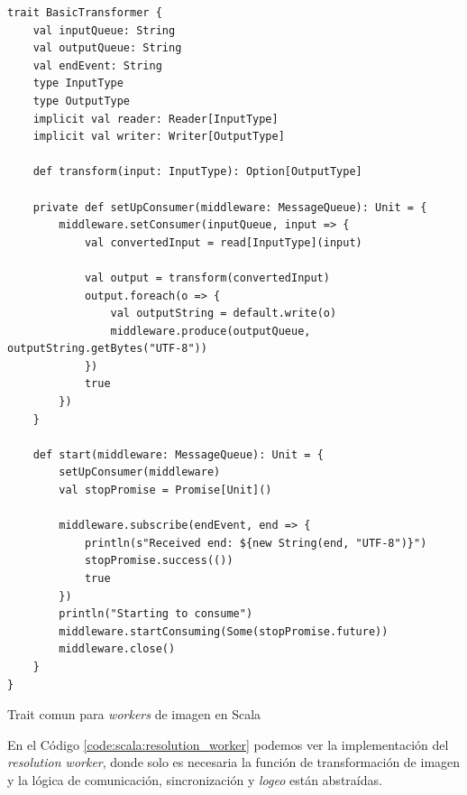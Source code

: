 \documentclass[11pt]{article}
\begin{document}
\begin{listing}[ht]
\begin{verbatim}
trait BasicTransformer {
    val inputQueue: String
    val outputQueue: String
    val endEvent: String
    type InputType
    type OutputType
    implicit val reader: Reader[InputType]
    implicit val writer: Writer[OutputType]

    def transform(input: InputType): Option[OutputType]

    private def setUpConsumer(middleware: MessageQueue): Unit = {
        middleware.setConsumer(inputQueue, input => {
            val convertedInput = read[InputType](input)

            val output = transform(convertedInput)
            output.foreach(o => {
                val outputString = default.write(o)
                middleware.produce(outputQueue, outputString.getBytes("UTF-8"))
            })
            true
        })
    }

    def start(middleware: MessageQueue): Unit = {
        setUpConsumer(middleware)
        val stopPromise = Promise[Unit]()

        middleware.subscribe(endEvent, end => {
            println(s"Received end: ${new String(end, "UTF-8")}")
            stopPromise.success(())
            true
        })
        println("Starting to consume")
        middleware.startConsuming(Some(stopPromise.future))
        middleware.close()
    }
}
\end{verbatim}
\caption{Trait comun para \textit{workers} de imagen en Scala}
\label{code:scala:basic_transformer}
\end{listing}

En el Código \ref{code:scala:resolution_worker} podemos ver la implementación del \textit{resolution worker}, donde solo es necesaria la función de transformación de imagen y la lógica de comunicación, sincronización y \textit{logeo} están abstraídas.
\end{document}
